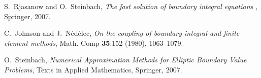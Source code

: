 \documentclass[runningheads]{lncse}
\begin{document}
\begin{thebibliography}{99}
{\sc S.~Rjasanow and O.~Steinbach}, {\em The fast solution of boundary integral
  equations%
   }, Springer, %
   2007.


{\sc C.~Johnson and J.~N{\'e}d{\'e}lec}, {\em On the coupling of boundary
  integral and finite element methods}, Math. Comp {\bf 35}:152 (1980),
  1063--1079.

{\sc O.~Steinbach},  {\em Numerical Approximation Methods for Elliptic Boundary Value
  Problems}, Texts in Applied Mathematics, Springer, 2007.


\end{thebibliography}
\end{document}
